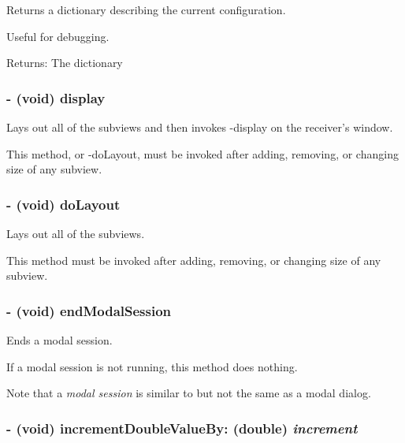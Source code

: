Returns a dictionary describing the current configuration. 

Useful for debugging. \begin{Desc}
\item[Returns:]The dictionary \end{Desc}
\hypertarget{interface_s_s_y_alert_d100de29cd1cd7f30f23bd0cf7f323e1}{
\subsubsection[{display}]{\setlength{\rightskip}{0pt plus 5cm}- (void) display }}
\label{interface_s_s_y_alert_d100de29cd1cd7f30f23bd0cf7f323e1}


Lays out all of the subviews and then invokes -display on the receiver's window. 

This method, or -doLayout, must be invoked after adding, removing, or changing size of any subview. \hypertarget{interface_s_s_y_alert_56274921e6a14427b3fded4caa007d2a}{
\subsubsection[{doLayout}]{\setlength{\rightskip}{0pt plus 5cm}- (void) doLayout }}
\label{interface_s_s_y_alert_56274921e6a14427b3fded4caa007d2a}


Lays out all of the subviews. 

This method must be invoked after adding, removing, or changing size of any subview. \hypertarget{interface_s_s_y_alert_eddadc2439805c46157f26b80fc92750}{
\subsubsection[{endModalSession}]{\setlength{\rightskip}{0pt plus 5cm}- (void) endModalSession }}
\label{interface_s_s_y_alert_eddadc2439805c46157f26b80fc92750}


Ends a modal session. 

If a modal session is not running, this method does nothing.

Note that a {\em modal session\/} is similar to but not the same as a modal dialog. \hypertarget{interface_s_s_y_alert_d63151a8a976c69f243c119472ee908b}{
\subsubsection[{incrementDoubleValueBy:}]{\setlength{\rightskip}{0pt plus 5cm}- (void) incrementDoubleValueBy: (double) {\em increment}}}
\label{interface_s_s_y_alert_d63151a8a976c69f243c119472ee908b}



